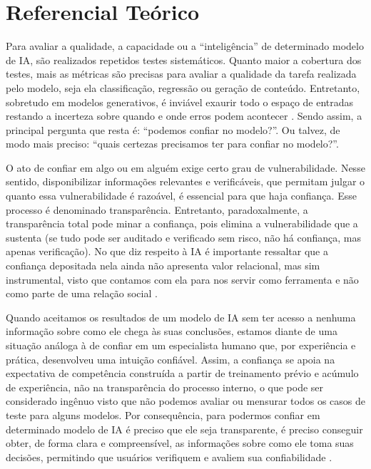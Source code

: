 \section{Referencial Teórico}\label{sec:referencial}

Para avaliar a qualidade, a capacidade ou a ``inteligência'' de determinado modelo de IA, são realizados repetidos testes sistemáticos. Quanto maior a cobertura dos testes, mais as métricas são precisas para avaliar a qualidade da tarefa realizada pelo modelo, seja ela classificação, regressão ou geração de conteúdo. Entretanto, sobretudo em modelos generativos, é inviável exaurir todo o espaço de entradas restando a incerteza sobre quando e onde erros podem acontecer \citep{Yu2025}. Sendo assim, a principal pergunta que resta é: ``podemos confiar no modelo?''. Ou talvez, de modo mais preciso: ``quais certezas precisamos ter para confiar no modelo?''.

O ato de confiar em algo ou em alguém exige certo grau de vulnerabilidade. Nesse sentido, disponibilizar informações relevantes e verificáveis, que permitam julgar o quanto essa vulnerabilidade é razoável, é essencial para que haja confiança. Esse processo é denominado transparência. Entretanto, paradoxalmente, a transparência total pode minar a confiança, pois elimina a vulnerabilidade que a sustenta (se tudo pode ser auditado e verificado sem risco, não há confiança, mas apenas verificação). No que diz respeito à IA é importante ressaltar que a confiança depositada nela ainda não apresenta valor relacional, mas sim instrumental, visto que contamos com ela para nos servir como ferramenta e não como parte de uma relação social \citep{Mitchell2025}.

Quando aceitamos os resultados de um modelo de IA sem ter acesso a nenhuma informação sobre como ele chega às suas conclusões, estamos diante de uma situação análoga à de confiar em um especialista humano que, por experiência e prática, desenvolveu uma intuição confiável. Assim, a confiança se apoia na expectativa de competência construída a partir de treinamento prévio e acúmulo de experiência, não na transparência do processo interno, o que pode ser considerado ingênuo visto que não podemos avaliar ou mensurar todos os casos de teste para alguns modelos. Por consequência, para podermos confiar em determinado modelo de IA é preciso que ele seja transparente, é preciso conseguir obter, de forma clara e compreensível, as informações sobre como ele toma suas decisões, permitindo que usuários verifiquem e avaliem sua confiabilidade \citep{Mitchell2025}.

